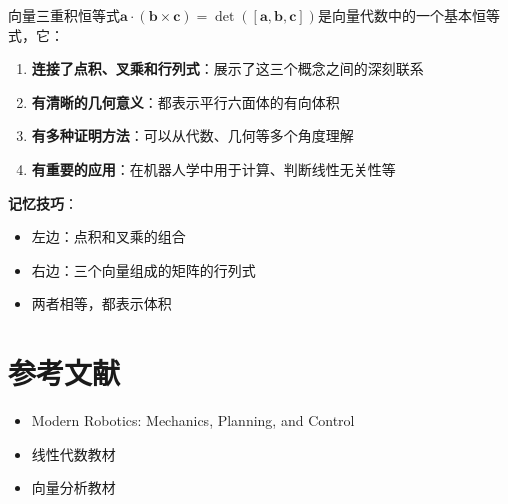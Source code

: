 \documentclass[12pt,a4paper]{article}
\begin{document}
向量三重积恒等式$\bm{a} \cdot (\bm{b} \times \bm{c}) = \det([\bm{a}, \bm{b}, \bm{c}])$是向量代数中的一个基本恒等式，它：

\begin{enumerate}
\item \textbf{连接了点积、叉乘和行列式}：展示了这三个概念之间的深刻联系
\item \textbf{有清晰的几何意义}：都表示平行六面体的有向体积
\item \textbf{有多种证明方法}：可以从代数、几何等多个角度理解
\item \textbf{有重要的应用}：在机器人学中用于计算、判断线性无关性等
\end{enumerate}

\textbf{记忆技巧}：
\begin{itemize}
\item 左边：点积和叉乘的组合
\item 右边：三个向量组成的矩阵的行列式
\item 两者相等，都表示体积
\end{itemize}

\section{参考文献}

\begin{itemize}
\item Modern Robotics: Mechanics, Planning, and Control
\item 线性代数教材
\item 向量分析教材
\end{itemize}
\end{document}
